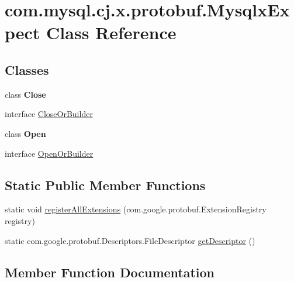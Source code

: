 \hypertarget{classcom_1_1mysql_1_1cj_1_1x_1_1protobuf_1_1_mysqlx_expect}{}\section{com.\+mysql.\+cj.\+x.\+protobuf.\+Mysqlx\+Expect Class Reference}
\label{classcom_1_1mysql_1_1cj_1_1x_1_1protobuf_1_1_mysqlx_expect}
\subsection*{Classes}
\begin{DoxyCompactItemize}
\item 
class {\bfseries Close}
\item 
interface \mbox{\hyperlink{interfacecom_1_1mysql_1_1cj_1_1x_1_1protobuf_1_1_mysqlx_expect_1_1_close_or_builder}{Close\+Or\+Builder}}
\item 
class {\bfseries Open}
\item 
interface \mbox{\hyperlink{interfacecom_1_1mysql_1_1cj_1_1x_1_1protobuf_1_1_mysqlx_expect_1_1_open_or_builder}{Open\+Or\+Builder}}
\end{DoxyCompactItemize}
\subsection*{Static Public Member Functions}
\begin{DoxyCompactItemize}
\item 
static void \mbox{\hyperlink{classcom_1_1mysql_1_1cj_1_1x_1_1protobuf_1_1_mysqlx_expect_ad11f0acd1644efca1f4e418da0d17e3c}{register\+All\+Extensions}} (com.\+google.\+protobuf.\+Extension\+Registry registry)
\item 
static com.\+google.\+protobuf.\+Descriptors.\+File\+Descriptor \mbox{\hyperlink{classcom_1_1mysql_1_1cj_1_1x_1_1protobuf_1_1_mysqlx_expect_a6070b9425234aa5620af2d6df91eb9d7}{get\+Descriptor}} ()
\end{DoxyCompactItemize}


\subsection{Member Function Documentation}
\mbox{\label{classcom_1_1mysql_1_1cj_1_1x_1_1protobuf_1_1_mysqlx_expect_a6070b9425234aa5620af2d6df91eb9d7}} 
